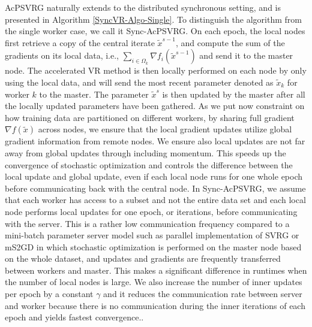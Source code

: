 \documentclass[10pt, conference, compsocconf]{IEEEtran}
\theoremstyle{definition}
\theoremstyle{remark}
\begin{document}
AcPSVRG naturally extends to the distributed synchronous
setting,  and  is  presented  in  Algorithm  \ref{SyncVR-Algo-Single}.  To  distinguish  the
algorithm from the single worker case, we call it Sync-AcPSVRG. On  each  epoch,  the  local  nodes  first  retrieve  a  copy of  the  central  iterate $\widetilde{x}^{s-1}$, and compute the sum of the gradients on its local data, i.e., $\sum_{i\in\Omega_k}{\nabla f_i{(\widetilde{x}^{s-1})}}$ and send it to the master node. The accelerated VR method is then locally performed on each node by only using the local data, and will send the most recent parameter denoted as $\widetilde{x}_k$ for worker $k$ to the master. The parameter $\widetilde{x}^s$ is then updated by the master after all the locally updated parameters have been gathered. As we put now constraint on how training data are partitioned on different workers, by sharing full gradient $\nabla f(\widetilde{x})$ across nodes, we ensure  that  the  local  gradient  updates  utilize  global  gradient information from remote nodes. We ensure also local updates are not far away from global updates through including momentum. This speeds up the convergence of stochastic optimization and controls the difference between the local update and global update, even if each local  node  runs  for  one  whole  epoch  before  communicating back with the central node. In Sync-AcPSVRG, we assume that each worker has access to a subset and not the entire data set and each local node performs local updates for one epoch, or iterations, before communicating with
the  server. This  is  a  rather  low  communication  frequency
compared  to  a mini-batch parameter  server  model such as parallel implementation of SVRG \cite{Zhao2014} or mS2GD \cite{Konecny2016} in which stochastic optimization is performed on the master node based on the whole dataset, and updates and gradients are frequently transferred between workers and master. This  makes  a  significant  difference  in  runtimes  when  the
number of local nodes is large.
 We also increase the number of inner updates per epoch by a constant $\gamma$ and it reduces the communication rate between server and worker because there is no communication during the inner iterations of each epoch and yields fastest convergence..
\end{document}
